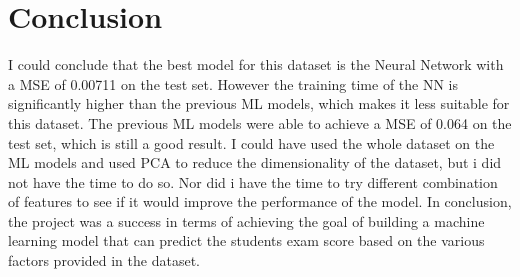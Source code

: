 \documentclass{assignment}
\begin{document}
\newpage
\section{Conclusion}
I could conclude that the best model for this dataset is the Neural Network with a MSE of 0.00711 on the test set.
However the training time of the NN is significantly higher than the previous ML models, which makes it less suitable for this dataset.
The previous ML models were able to achieve a MSE of 0.064 on the test set, which is still a good result.
I could have used the whole dataset on the ML models and used PCA to reduce the dimensionality of the dataset, but i did not have the time to do so. 
Nor did i have the time to try different combination of features to see if it would improve the performance of the model.
In conclusion, the project was a success in terms of achieving the goal of building a machine learning model that can predict the students exam score based on the various factors provided in the dataset. 
\end{document}
